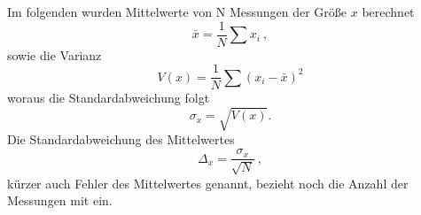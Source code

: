 Im folgenden wurden Mittelwerte von N Messungen der Größe $x$ berechnet
\begin{equation}
\bar{x} =  \frac{1}{N} \sum x_i \ ,
\end{equation}
sowie die Varianz
\begin{equation}
V(x) = \frac{1}{N} \sum (x_i - \bar{x})^2
\end{equation}
woraus die Standardabweichung folgt
\begin{equation}
\sigma_x = \sqrt{V(x)}.
\end{equation}
Die Standardabweichung des Mittelwertes
\begin{equation}
\Delta_{x} = \frac{\sigma_x}{\sqrt{N}} \ ,
\end{equation}
kürzer auch Fehler des Mittelwertes genannt, bezieht noch die Anzahl der Messungen mit ein.